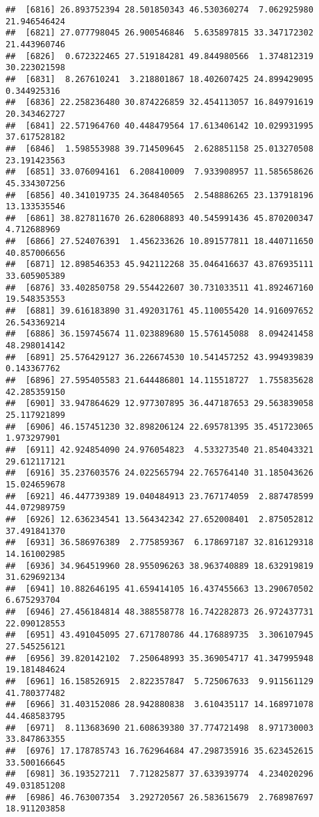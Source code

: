 \documentclass[
]{article}
\begin{document}
\begin{verbatim}
##  [6816] 26.893752394 28.501850343 46.530360274  7.062925980 21.946546424
##  [6821] 27.077798045 26.900546846  5.635897815 33.347172302 21.443960746
##  [6826]  0.672322465 27.519184281 49.844980566  1.374812319 30.223021598
##  [6831]  8.267610241  3.218801867 18.402607425 24.899429095  0.344925316
##  [6836] 22.258236480 30.874226859 32.454113057 16.849791619 20.343462727
##  [6841] 22.571964760 40.448479564 17.613406142 10.029931995 37.617528182
##  [6846]  1.598553988 39.714509645  2.628851158 25.013270508 23.191423563
##  [6851] 33.076094161  6.208410009  7.933908957 11.585658626 45.334307256
##  [6856] 40.341019735 24.364840565  2.548886265 23.137918196 13.133535546
##  [6861] 38.827811670 26.628068893 40.545991436 45.870200347  4.712688969
##  [6866] 27.524076391  1.456233626 10.891577811 18.440711650 40.857006656
##  [6871] 12.898546353 45.942112268 35.046416637 43.876935111 33.605905389
##  [6876] 33.402850758 29.554422607 30.731033511 41.892467160 19.548353553
##  [6881] 39.616183890 31.492031761 45.110055420 14.916097652 26.543369214
##  [6886] 36.159745674 11.023889680 15.576145088  8.094241458 48.298014142
##  [6891] 25.576429127 36.226674530 10.541457252 43.994939839  0.143367762
##  [6896] 27.595405583 21.644486801 14.115518727  1.755835628 42.285359150
##  [6901] 33.947864629 12.977307895 36.447187653 29.563839058 25.117921899
##  [6906] 46.157451230 32.898206124 22.695781395 35.451723065  1.973297901
##  [6911] 42.924854090 24.976054823  4.533273540 21.854043321 29.612117121
##  [6916] 35.237603576 24.022565794 22.765764140 31.185043626 15.024659678
##  [6921] 46.447739389 19.040484913 23.767174059  2.887478599 44.072989759
##  [6926] 12.636234541 13.564342342 27.652008401  2.875052812 37.491841370
##  [6931] 36.586976389  2.775859367  6.178697187 32.816129318 14.161002985
##  [6936] 34.964519960 28.955096263 38.963740889 18.632919819 31.629692134
##  [6941] 10.882646195 41.659414105 16.437455663 13.290670502  6.675293704
##  [6946] 27.456184814 48.388558778 16.742282873 26.972437731 22.090128553
##  [6951] 43.491045095 27.671780786 44.176889735  3.306107945 27.545256121
##  [6956] 39.820142102  7.250648993 35.369054717 41.347995948 19.181484624
##  [6961] 16.158526915  2.822357847  5.725067633  9.911561129 41.780377482
##  [6966] 31.403152086 28.942880838  3.610435117 14.168971078 44.468583795
##  [6971]  8.113683690 21.608639380 37.774721498  8.971730003 33.847863355
##  [6976] 17.178785743 16.762964684 47.298735916 35.623452615 33.500166645
##  [6981] 36.193527211  7.712825877 37.633939774  4.234020296 49.031851208
##  [6986] 46.763007354  3.292720567 26.583615679  2.768987697 18.911203858

\end{verbatim}
\end{document}
